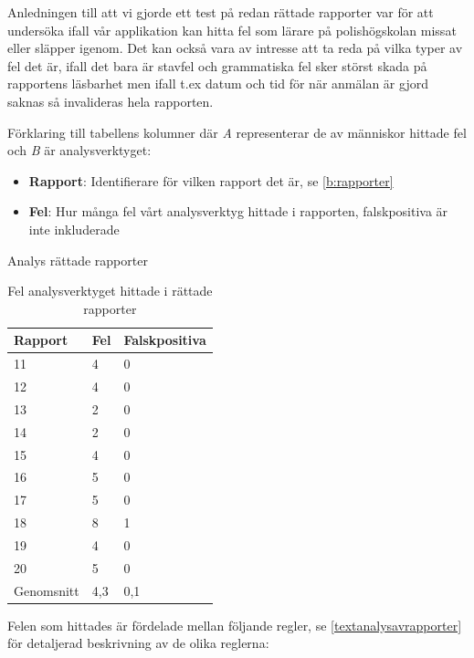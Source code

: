 \documentclass[swedish]{maucsthesis}
\begin{document}
Anledningen till att vi gjorde ett test på redan rättade rapporter var för att undersöka ifall vår applikation kan hitta fel som lärare på polishögskolan missat eller släpper igenom.
Det kan också vara av intresse att ta reda på vilka typer av fel det är, ifall det bara är stavfel och grammatiska fel sker störst skada på rapportens läsbarhet men ifall
t.ex datum och tid för när anmälan är gjord saknas så invalideras hela rapporten.

Förklaring till tabellens kolumner där \textit{A} representerar de av människor hittade fel och \textit{B} är analysverktyget:

\begin{itemize}
\item \textbf{Rapport}: Identifierare för vilken rapport det är, se \cref{b:rapporter} 
\item \textbf{Fel}: Hur många fel vårt analysverktyg hittade i rapporten, falskpositiva är inte inkluderade
\end{itemize}

\begin{table}[H]
\centering
\caption{Analys rättade rapporter}
\begin{tabular}{|l|l|l|}
\hline
Rapport    & Fel & Falskpositiva  \\ \hline
11          & 4   & 0             \\ \hline
12          & 4   & 0             \\ \hline
13          & 2   & 0             \\ \hline
14          & 2   & 0             \\ \hline
15          & 4   & 0             \\ \hline
16          & 5   & 0             \\ \hline
17          & 5   & 0             \\ \hline
18          & 8   & 1             \\ \hline
19          & 4   & 0             \\ \hline
20          & 5   & 0             \\ \hline
Genomsnitt  & 4,3 & 0,1            \\ \hline
\end{tabular}
\caption*{Fel analysverktyget hittade i rättade rapporter}
\label{gradedtable}
\end{table}

Felen som hittades är fördelade mellan följande regler, se \cref{textanalysavrapporter} för detaljerad beskrivning av
de olika reglerna:
\end{document}
